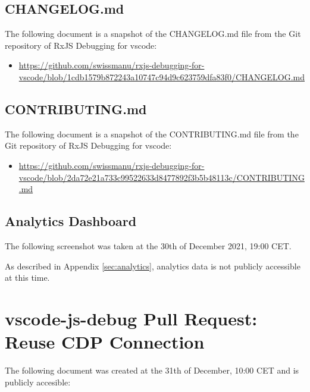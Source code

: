 


\subsection{CHANGELOG.md}
\label{sec:changelog}
The following document is a snapshot of the CHANGELOG.md file from the Git repository of RxJS Debugging for vscode:

\begin{itemize}
  \item \url{https://github.com/swissmanu/rxjs-debugging-for-vscode/blob/1cdb1579b872243a10747c94d9c623759dfa83f0/CHANGELOG.md}
\end{itemize}





\subsection{CONTRIBUTING.md}
\label{sec:contributing}
The following document is a snapshot of the CONTRIBUTING.md file from the Git repository of RxJS Debugging for vscode:

\begin{itemize}
  \item \url{https://github.com/swissmanu/rxjs-debugging-for-vscode/blob/2da72e21a733c99522633d8477892f3b5b48113c/CONTRIBUTING.md}
\end{itemize}





\subsection{Analytics Dashboard}
\label{sec:analytics-dashboard}
The following screenshot was taken at the 30th of December 2021, 19:00 CET.

As described in Appendix \ref{sec:analytics}, analytics data is not publicly accessible at this time.





\section{vscode-js-debug Pull Request: Reuse CDP Connection}
\label{sec:cdp-pull-request}
The following document was created at the 31th of December, 10:00 CET and is publicly accesible:

